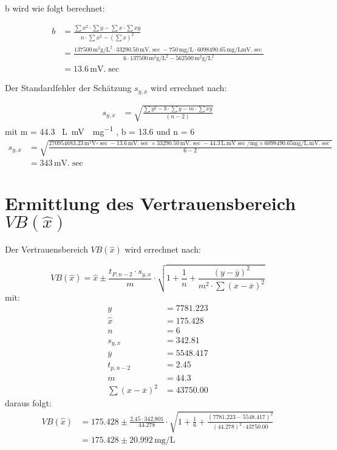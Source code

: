 \documentclass{article}
\begin{document}
  b wird wie folgt berechnet:

\begin{align}
  b &= \frac{\sum x^2 \cdot \sum y - \sum x \cdot \sum x y}{n \cdot \sum x^2 - (\sum x )^2}\\
    & = \frac{\num{137500} \, \si{\square\milli\gram\per\square\liter} \cdot  \num{33290.50} \,  \si{\milli\volt.\sec} -   750 \, \si{\milli\gram\per\liter} \cdot  \num{6098490.65} \, \si{\milli\gram\per\liter} \si{\milli\volt.\sec}}{6  \cdot \num{137500} \, \si{\square\milli\gram\per\square\liter}  - \num{562500} \, \si{\square\milli\gram\per\square\liter}}\\
    &  = 13.6 \, \si{\milli\volt.\sec}
\end{align}



  Der Standardfehler der Schätzung $s_{y,x}$ wird errechnet nach:

\begin{align}
 s_{y,x} &= \sqrt{\frac{\sum y^2 - b \cdot \sum y - m \cdot \sum xy}{(n-2)}}
\end{align}
mit m = 44.3 \, \si{\liter.\milli\volt\sec\per\milli\gram} , b = 13.6 und n = 6
\begin{align*}
  s_{y,x} &=\sqrt{ \frac{ \num{270954683.23} \, \si{\square\milli\volt} \si{\square\sec} - 13.6 \, \si{\milli\volt.\sec} \times \num{33290.50} \, \si{\milli\volt.\sec}
   -  44.3 \, \si{\liter.\milli\volt\sec\per\milli\gram} \times \num{6098490.65} \si{\milli\gram\per\liter.\milli\volt.\sec} } {6-2}} \\
  &= 343 \, \si{\milli\volt.\sec}
\end{align*}
\section{Ermittlung des Vertrauensbereich $ VB(\hat{x}) $}
\begin{flushleft}
  Der Vertrauensbereich $VB(\hat{x})$ wird errechnet nach:
\end{flushleft}
\begin{equation}
  VB(\hat{x}) = \hat{x} \pm \frac{t_{P,n-2} \cdot s _{y,x}}{m} \cdot \sqrt{1+\frac{1}{n}+\frac{(y-\overline{y})^2}{m^2 \cdot \sum (x -\overline{x})^2}}
\end{equation}
mit:
\begin{align*}
   y &= 7781.223 \\
   \hat{x} & = 175.428 \\
   n &= 6 \\
   s_{y,x} &= 342.81 \\
   \overline{y} & = 5548.417 \\
   t_{p,n-2} &= 2.45 \\
   m &= 44.3\\
   \sum (x -\overline{x})^2&= \num{43750.00}
 \end{align*}
 daraus folgt:
\begin{align*}
   VB(\hat{x}) &= 175.428 \pm \frac{2.45 \cdot 342.801}{44.278} \cdot  \sqrt{1+\frac{1}{6}+\frac{(\num{7781.223}-\num{5548.417})^2}{(44.278)^2 \cdot 43750.00 }}\\
    &=175.428 \pm 20.992 \, \si{\milli\gram\per\liter}
 \end{align*}
\end{document}
